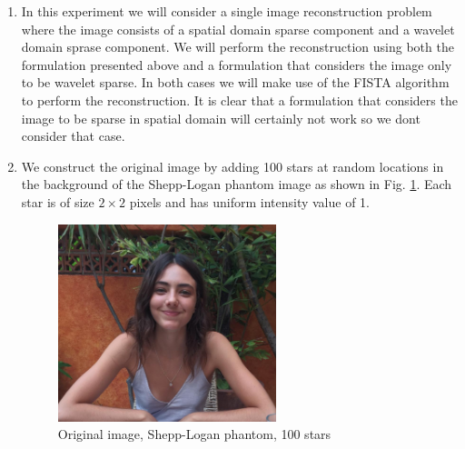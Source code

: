 \begin{enumerate}
\item In this experiment we will consider a single image reconstruction problem where the image consists of a spatial domain sparse component and a wavelet domain sprase component. We will perform the reconstruction using both the formulation presented above and a formulation that considers the image only to be wavelet sparse. In both cases we will make use of the FISTA algorithm to perform the reconstruction. It is clear that a formulation that considers the image to be sparse in spatial domain will certainly not work so we dont consider that case.
\item We construct the original image by adding 100 stars at random locations in the background of the Shepp-Logan phantom image as shown in Fig. \ref{fig:expt42}. Each star is of size $2\times2$ pixels and has uniform intensity value of 1.

 \begin{figure}[t!]
	\centering \vspace{-0.1in}
	\includegraphics[width=2.5in]{images/expt4/2.png}
	 \caption[Original image, Shepp-Logan phantom, 100 stars ]{\small Original image, Shepp-Logan phantom, 100 stars}
	\label{fig:expt42}
\end{figure}



\end{enumerate}
